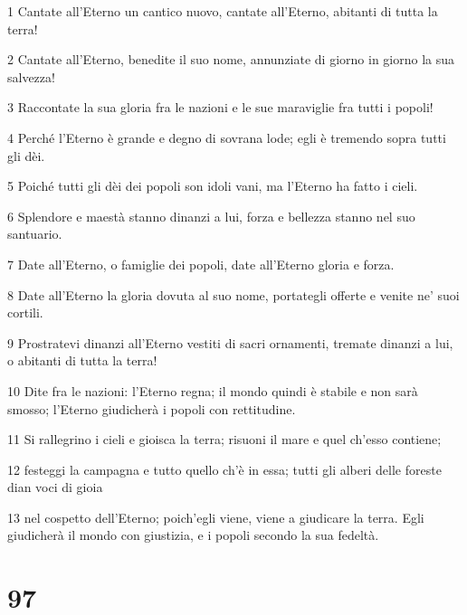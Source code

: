 \par 1 Cantate all'Eterno un cantico nuovo, cantate all'Eterno, abitanti di tutta la terra!
\par 2 Cantate all'Eterno, benedite il suo nome, annunziate di giorno in giorno la sua salvezza!
\par 3 Raccontate la sua gloria fra le nazioni e le sue maraviglie fra tutti i popoli!
\par 4 Perché l'Eterno è grande e degno di sovrana lode; egli è tremendo sopra tutti gli dèi.
\par 5 Poiché tutti gli dèi dei popoli son idoli vani, ma l'Eterno ha fatto i cieli.
\par 6 Splendore e maestà stanno dinanzi a lui, forza e bellezza stanno nel suo santuario.
\par 7 Date all'Eterno, o famiglie dei popoli, date all'Eterno gloria e forza.
\par 8 Date all'Eterno la gloria dovuta al suo nome, portategli offerte e venite ne' suoi cortili.
\par 9 Prostratevi dinanzi all'Eterno vestiti di sacri ornamenti, tremate dinanzi a lui, o abitanti di tutta la terra!
\par 10 Dite fra le nazioni: l'Eterno regna; il mondo quindi è stabile e non sarà smosso; l'Eterno giudicherà i popoli con rettitudine.
\par 11 Si rallegrino i cieli e gioisca la terra; risuoni il mare e quel ch'esso contiene;
\par 12 festeggi la campagna e tutto quello ch'è in essa; tutti gli alberi delle foreste dian voci di gioia
\par 13 nel cospetto dell'Eterno; poich'egli viene, viene a giudicare la terra. Egli giudicherà il mondo con giustizia, e i popoli secondo la sua fedeltà.

\chapter{97}

